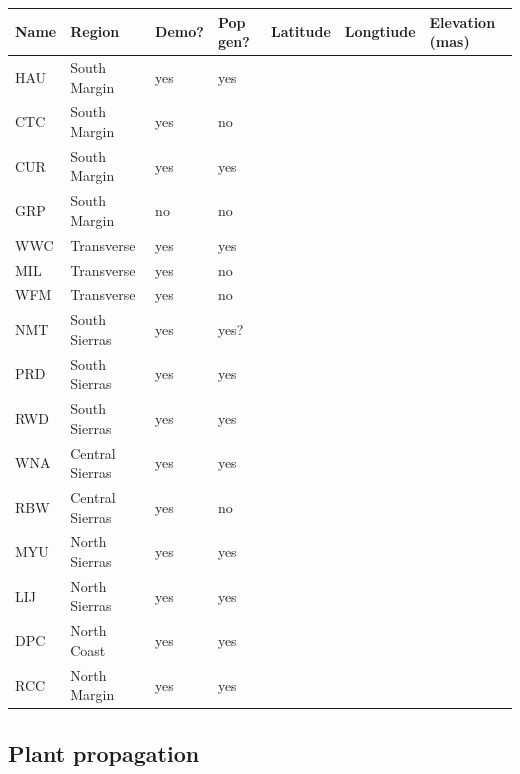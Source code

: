 \documentclass[11pt, oneside]{article}\usepackage[]{graphicx}\usepackage[]{color}
\begin{document}
\begin{table}[ht]
   \centering
   \begin{tabular}{@{} lllllll @{}}
      \toprule
  Name& Region  & Demo?& Pop gen?& Latitude  & Longtiude  & Elevation (mas) \\
      \midrule
	HAU & South Margin		& yes	& yes	& 	& 
    	&    \\
	CTC	& South Margin		& yes	& no	&  & 
    	&    \\
	CUR	& South Margin		& yes	& yes &  & 
    	&    \\
	GRP & South Margin		& no	& no	&  &
    	&    \\
	WWC &	Transverse		  & yes	& yes	&  & 
    	&    \\
	MIL	& Transverse	  	& yes	& no	&  & 
    	&    \\
	WFM	& Transverse	  	& yes	& no	&  & 
    	&    \\
	NMT	& South Sierras		& yes	& yes?&  & 
    	&    \\
	PRD	& South Sierras		& yes	& yes	&  & 
    	&    \\
	RWD	& South Sierras		& yes	& yes	&  & 
    	&    \\
	WNA	& Central Sierras	& yes	& yes	&  & 
    	&    \\
	RBW	& Central Sierras	& yes	& no	&  & 
    	&    \\
	MYU	& North Sierras		& yes	& yes	&  & 
    	&    \\
	LIJ	& North Sierras		& yes	& yes	&  & 
    	&    \\
	DPC	& North Coast	  	& yes	& yes	&  & 
    	&    \\
	RCC	& North Margin		& yes	& yes	&  & 
    	&    \\
	\bottomrule
   \end{tabular}
\end{table}

\subsection*{Plant propagation}
\end{document}
